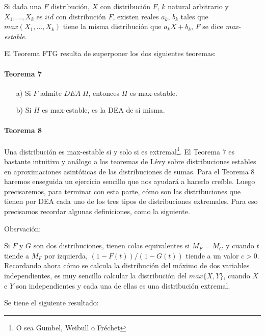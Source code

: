 \documentclass[
]{book}
\theoremstyle{definition}
\theoremstyle{definition}
\theoremstyle{definition}
\theoremstyle{definition}
\theoremstyle{remark}
\begin{document}
Si dada una \(F\) distribución, \(X\) con distribución \(F\), \(k\) natural arbitrario y \(X_1,...,X_k\) es \(iid\) con distribución \(F\), existen reales \(a_k\), \(b_k\) tales que \(max(X_1,...,X_k)\) tiene la misma distribución que \(a_k X+ b_k\), \(F\) se dice \textit{max-estable}.

El Teorema FTG resulta de superponer los dos siguientes teoremas:

\paragraph{Teorema 7}\label{teorema-7}

\begin{itemize}
  \item[a)] Si $F$ admite $DEA\;H$, entonces $H$ es max-estable.
  \item[b)] Si $H$ es max-estable, es la DEA de sí misma.
\end{itemize}

\paragraph{Teorema 8}\label{teorema-8}

Una distribución es max-estable si y solo si es extremal\footnote{O sea Gumbel, Weibull o Fréchet}.
El Teorema 7 es bastante intuitivo y análogo a los teoremas de Lévy sobre distribuciones estables en aproximaciones asintóticas de las distribuciones de sumas. Para el Teorema 8 haremos enseguida un ejercicio sencillo que nos ayudará a hacerlo creíble.
Luego precisaremos, para terminar con esta parte, cómo son las distribuciones que tienen por DEA cada uno de los tres tipos de distribuciones extremales. Para eso precisamos recordar algunas definiciones, como la siguiente.

Obsrvación:

Si \(F\) y \(G\) son dos distribuciones, tienen colas equivalentes si \(M_F=M_G\) y cuando \(t\) tiende a \(M_F\) por izquierda, \((1-F(t))/(1-G(t))\) tiende a un valor \(c>0\).
Recordando ahora cómo se calcula la distribución del máximo de dos variables independientes, es muy sencillo calcular la distribución del \(max\{X,Y\}\), cuando \(X\) e \(Y\) son independientes y cada una de ellas es una distribución extremal.

Se tiene el siguiente resultado:
\end{document}

